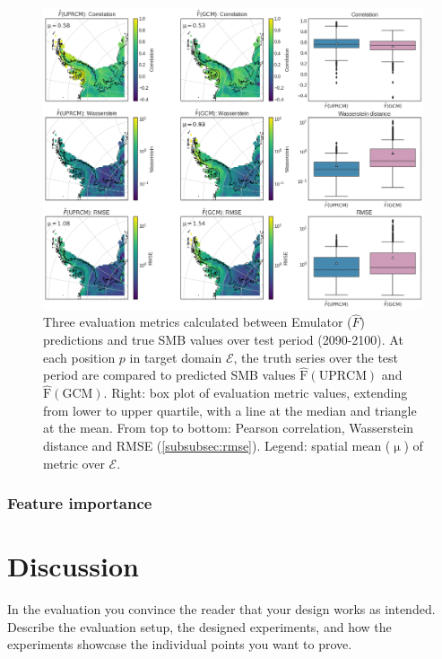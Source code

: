 \documentclass[a4paper,11pt,oneside]{report}
\begin{document}
\begin{figure}[thb]
  \centering
  \includegraphics[width=\columnwidth]{doc/Thesis-latex/images/results/metrics_RCM_GCM.png}
  \caption []{\small Three evaluation metrics calculated between Emulator ($\hat{F}$) predictions and true SMB values over test period (2090-2100). At each position $p$ in target domain $\mathcal{E}$, the truth series over the test period are compared to predicted SMB values $\operatorname{\hat{F}(UPRCM)}$ and $\operatorname{\hat{F}(GCM)}$. Right: box plot of evaluation metric values, extending from lower to upper quartile, with a line at the median and triangle at the mean. From top to bottom: Pearson correlation, Wasserstein distance and RMSE (\ref{subsubsec:rmse}). Legend: spatial mean ($\operatorname{\mu}$) of metric over $\mathcal{E}$. }
  \vspace{-3mm}
  \label{fig:evaluation-GCM-RCM}
\end{figure}

\subsection{Feature importance}

\chapter{Discussion}

In the evaluation you convince the reader that your design works as intended.
Describe the evaluation setup, the designed experiments, and how the
experiments showcase the individual points you want to prove.
\end{document}

